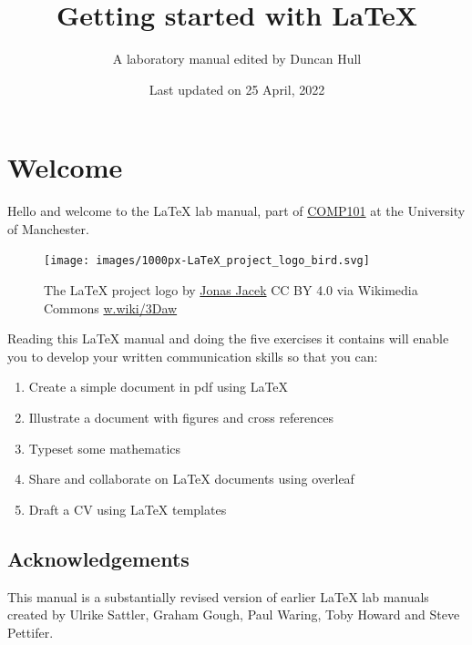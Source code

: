 \documentclass[
]{book}
\title{Getting started with LaTeX}
\author{A laboratory manual edited by Duncan Hull}
\date{Last updated on 25 April, 2022}
\providecommand{\tightlist}{%
  \setlength{\itemsep}{0pt}\setlength{\parskip}{0pt}}
\begin{document}
\maketitle

{
\setcounter{tocdepth}{1}
\tableofcontents
}
\hypertarget{welcome}{%
\chapter*{Welcome}\label{welcome}}

Hello and welcome to the LaTeX lab manual, part of \href{https://studentnet.cs.manchester.ac.uk/ugt/COMP10120/syllabus/}{COMP101} at the University of Manchester.

\begin{figure}

{\centering \texttt{[image: images/1000px-LaTeX\_project\_logo\_bird.svg]} 

}

\caption{The LaTeX project logo by \href{https://www.jonas.me/}{Jonas Jacek} CC BY 4.0 via Wikimedia Commons \href{https://w.wiki/3Daw}{w.wiki/3Daw}}\label{fig:latexproject-fig}
\end{figure}



Reading this LaTeX manual and doing the five exercises it contains will enable you to develop your written communication skills so that you can:

\begin{enumerate}
\def\labelenumi{\arabic{enumi}.}
\tightlist
\item
  Create a simple document in pdf using LaTeX
\item
  Illustrate a document with figures and cross references
\item
  Typeset some mathematics
\item
  Share and collaborate on LaTeX documents using overleaf
\item
  Draft a CV using LaTeX templates
\end{enumerate}

\hypertarget{acknowledgements}{%
\section*{Acknowledgements}\label{acknowledgements}}

This manual is a substantially revised version of earlier LaTeX lab manuals created by Ulrike Sattler, Graham Gough, Paul Waring, Toby Howard and Steve Pettifer.
\end{document}
